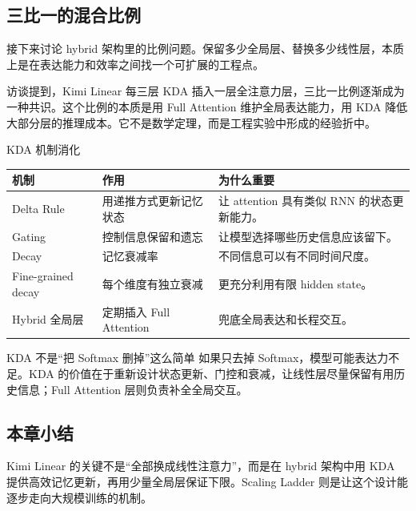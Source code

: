 \subsection{三比一的混合比例}

接下来讨论 hybrid 架构里的比例问题。保留多少全局层、替换多少线性层，本质上是在表达能力和效率之间找一个可扩展的工程点。

访谈提到，Kimi Linear 每三层 KDA 插入一层全注意力层，三比一比例逐渐成为一种共识。这个比例的本质是用 Full Attention 维护全局表达能力，用 KDA 降低大部分层的推理成本。它不是数学定理，而是工程实验中形成的经验折中。

\begin{knowledgebox}{KDA 机制消化}
\begin{tabularx}{\textwidth}{p{}p{}X}
\toprule
机制 & 作用 & 为什么重要 \\
\midrule
Delta Rule & 用递推方式更新记忆状态 & 让 attention 具有类似 RNN 的状态更新能力。 \\
Gating & 控制信息保留和遗忘 & 让模型选择哪些历史信息应该留下。 \\
Decay & 记忆衰减率 & 不同信息可以有不同时间尺度。 \\
Fine-grained decay & 每个维度有独立衰减 & 更充分利用有限 hidden state。 \\
Hybrid 全局层 & 定期插入 Full Attention & 兜底全局表达和长程交互。 \\
\bottomrule
\end{tabularx}
\end{knowledgebox}

\begin{warningbox}{KDA 不是“把 Softmax 删掉”这么简单}
如果只去掉 Softmax，模型可能表达力不足。KDA 的价值在于重新设计状态更新、门控和衰减，让线性层尽量保留有用历史信息；Full Attention 层则负责补全全局交互。
\end{warningbox}

\subsection{本章小结}

Kimi Linear 的关键不是“全部换成线性注意力”，而是在 hybrid 架构中用 KDA 提供高效记忆更新，再用少量全局层保证下限。Scaling Ladder 则是让这个设计能逐步走向大规模训练的机制。

